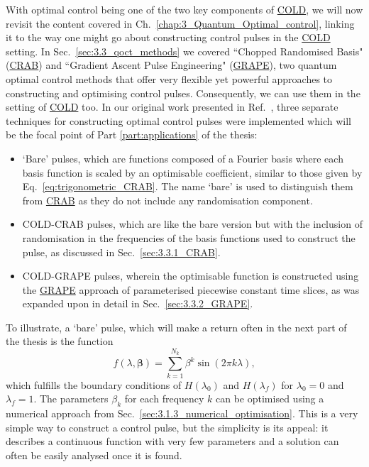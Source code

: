 \documentclass[a4paper,oneside,11pt]{book}
\newcommand{\betabb}{\boldsymbol{\beta}}
\newcommand{\acrref}[1]{\hyperref[acr:#1]{#1}}
\begin{document}
With optimal control being one of the two key components of \acrref{COLD}, we will now revisit the content covered in Ch.~\ref{chap:3_Quantum_Optimal_control}, linking it to the way one might go about constructing control pulses in the \acrref{COLD} setting. In Sec.~\ref{sec:3.3_qoct_methods} we covered ``Chopped Randomised Basis" (\acrref{CRAB}) and ``Gradient Ascent Pulse Engineering" (\acrref{GRAPE}), two quantum optimal control methods that offer very flexible yet powerful approaches to constructing and optimising control pulses. Consequently, we can use them in the setting of \acrref{COLD} too. In our original work presented in Ref.~\cite{cepaite_counterdiabatic_2023}, three separate techniques for constructing optimal control pulses were implemented which will be the focal point of Part \ref{part:applications} of the thesis:
\begin{itemize}
    \item `Bare' pulses, which are functions composed of a Fourier basis where each basis function is scaled by an optimisable coefficient, similar to those given by Eq.~\ref{eq:trigonometric_CRAB}. The name `bare' is used to distinguish them from \acrref{CRAB} as they do not include any randomisation component.
    \item COLD-CRAB pulses, which are like the bare version but with the inclusion of randomisation in the frequencies of the basis functions used to construct the pulse, as discussed in Sec.~\ref{sec:3.3.1_CRAB}.
    \item COLD-GRAPE pulses, wherein the optimisable function is constructed using the \acrref{GRAPE} approach of parameterised piecewise constant time slices, as was expanded upon in detail in Sec.~\ref{sec:3.3.2_GRAPE}. 
\end{itemize}

To illustrate, a `bare' pulse, which will make a return often in the next part of the thesis is the function
\begin{equation}\label{eq:bare_pulse}
    f(\lambda, \betabb) = \sum_{k=1}^{N_k} \beta^k \sin (2 \pi k \lambda),
\end{equation}
which fulfills the boundary conditions of $H(\lambda_0)$ and $H(\lambda_f)$ for $\lambda_0 = 0$ and $\lambda_f = 1$. The parameters $\beta_k$ for each frequency $k$ can be optimised using a numerical approach from Sec.~\ref{sec:3.1.3_numerical_optimisation}. This is a very simple way to construct a control pulse, but the simplicity is its appeal: it describes a continuous function with very few parameters and a solution can often be easily analysed once it is found.
\end{document}
